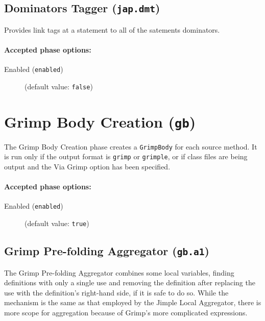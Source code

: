 \documentclass{article}
\begin{document}
\subsection{Dominators Tagger ({\tt jap.dmt})}
Provides link tags at a statement to all of the satements dominators.

\paragraph{Accepted phase options:} 

\begin{description}

\item[Enabled ({\tt enabled})]
(default value: {\tt false})






\end{description}

\section{Grimp Body Creation ({\tt gb})}

The Grimp Body Creation phase creates a {\tt GrimpBody} for
each source method. It is run only if the output format is
{\tt grimp} or {\tt grimple}, or if class files are being
output and the Via Grimp option has been specified.


\paragraph{Accepted phase options:} 

\begin{description}

\item[Enabled ({\tt enabled})]
(default value: {\tt true})






\end{description}

\subsection{Grimp Pre-folding Aggregator ({\tt gb.a1})}

The Grimp Pre-folding Aggregator combines some local variables,
finding definitions with only a single use and removing the
definition after replacing the use with the definition's
right-hand side, if it is safe to do so. While the mechanism is
the same as that employed by the Jimple Local Aggregator, there
is more scope for aggregation because of Grimp's more complicated
expressions.
\end{document}
